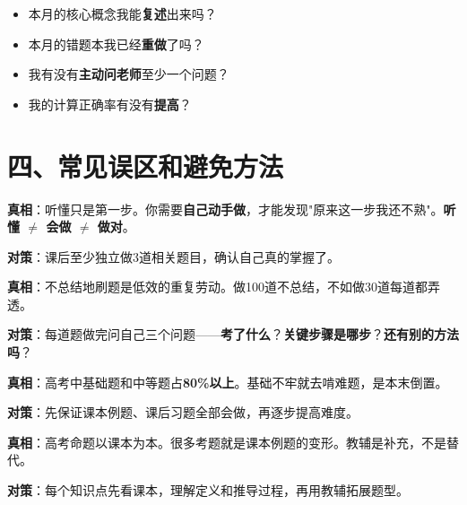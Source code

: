 \documentclass[12pt, a4paper]{ctexart}
\begin{document}
\begin{tipbox}[每月自检清单]
\begin{itemize}[leftmargin=2em]
  \item 本月的核心概念我能\textbf{复述}出来吗？
  \item 本月的错题本我已经\textbf{重做}了吗？
  \item 我有没有\textbf{主动问老师}至少一个问题？
  \item 我的计算正确率有没有\textbf{提高}？
\end{itemize}
\end{tipbox}


\section*{\textcolor{mainblue}{四、常见误区和避免方法}}

\begin{warnbox}[误区一：上课听懂 = 我会了]
\textbf{真相}：听懂只是第一步。你需要\textbf{自己动手做}，才能发现"原来这一步我还不熟"。\textbf{听懂 $\neq$ 会做 $\neq$ 做对}。

\textbf{对策}：课后至少独立做3道相关题目，确认自己真的掌握了。
\end{warnbox}

\begin{warnbox}
\textbf{真相}：不总结地刷题是低效的重复劳动。做100道不总结，不如做30道每道都弄透。

\textbf{对策}：每道题做完问自己三个问题——\textbf{考了什么}？\textbf{关键步骤是哪步}？\textbf{还有别的方法吗}？
\end{warnbox}

\begin{warnbox}
\textbf{真相}：高考中基础题和中等题占\textbf{80\%以上}。基础不牢就去啃难题，是本末倒置。

\textbf{对策}：先保证课本例题、课后习题全部会做，再逐步提高难度。
\end{warnbox}

\begin{warnbox}
\textbf{真相}：高考命题以课本为本。很多考题就是课本例题的变形。教辅是补充，不是替代。

\textbf{对策}：每个知识点先看课本，理解定义和推导过程，再用教辅拓展题型。
\end{warnbox}
\end{document}
